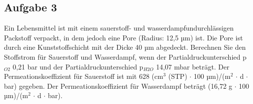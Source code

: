 \documentclass[a4paper,11pt]{article}
\newif\ifshowme
\begin{document}


\ifshowme
\antwort{
\textbf{Sauerstoff:}
\begin{align*}
\dot{n} &= D \cdot A \cdot \frac{\Delta c}{l} \\
		&= 0,243 ~\text{cm}^2/\text{s} \cdot (\pi \cdot (1,25 \cdot 10^{-3}~\text{cm})^2) \cdot \frac{0,191 ~\text{cm}^3 \text{/cm$^3$}}{4 \cdot 10^{-3}~\text{cm} } \\
		&= 5,69 \cdot 10^{-5} ~\text{cm$^3$/s}
\end{align*}



\textbf{Wasser:}
\begin{align*}
\dot{n} &= D \cdot A \cdot \frac{\Delta c}{l} \\
		&= 0,243 ~\text{cm}^2/\text{s} \cdot (\pi \cdot (1,25 \cdot 10^{-3}~\text{cm})^2) \cdot \frac{1,291 \cdot 10^{-5} ~\text{g}\text{/cm$^3$}}{4 \cdot 10^{-3}~\text{cm} } \\
		&= 3,85 \cdot 10^{-9} ~\text{g/s}
\end{align*}
}
\else
\fi



\subsection*{Aufgabe 3}
Ein Lebensmittel ist mit einem sauerstoff- und wasserdampfundurchlässigen Packstoff
verpackt, in dem jedoch eine Pore (Radius: 12,5 µm) ist. Die Pore ist durch eine
Kunststoffschicht mit der Dicke 40 µm abgedeckt. Berechnen Sie den Stoffstrom für
Sauerstoff und Wasserdampf, wenn der Partialdruckunterschied p$_{O2}$ 0,21 bar und der
Partialdruckunterschied p$_{H2O}$ 14,07 mbar beträgt. Der Permeationskoeffizient für Sauerstoff ist mit 628 (cm$^3$ (STP) $\cdot$ 100 µm)/(m$^2$ $\cdot$ d $\cdot$ bar) gegeben. Der Permeationskoeffizient für Wasserdampf beträgt (16,72 g $\cdot$ 100 µm)/(m$^2$ $\cdot$ d $\cdot$ bar).

%
%
%
\end{document}
